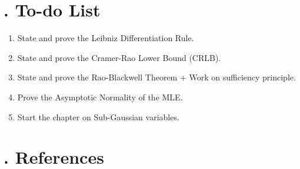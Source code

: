 \newpage

\listoftheorems[ignoreall,show=dfn]

\setcounter{section}{2}


\newpage\section{. To-do List}
\begin{enumerate}
	\item State and prove the Leibniz Differentiation Rule.
	\item State and prove the Cramer-Rao Lower Bound (CRLB).
	\item State and prove the Rao-Blackwell Theorem + Work on sufficiency principle.
	\item Prove the Asymptotic Normality of the MLE.
	\item Start the chapter on Sub-Gaussian variables.
\end{enumerate} 

\newpage
\section{. References}
\nocite{*}
\printbibliography